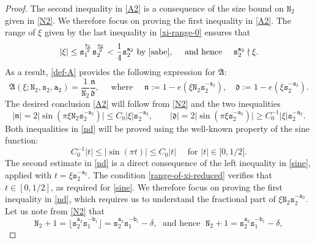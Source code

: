 \documentclass[12pt, twoside]{article}
\theoremstyle{definition}
\numberwithin{equation}{section}
\begin{document}
\begin{proof} 
The second inequality in \eqref{A2} is a consequence of the size bound on $\mathtt N_2$ given in \eqref{N2}. We therefore focus on proving the first inequality in \eqref{A2}.
\vskip0.1in
\noindent The range of $\xi$ given by the last inequality in \eqref{xi-range-0} ensures that 
\begin{equation} |\xi| \leq \mathtt s_1^{\frac{\mathtt b_1}{2}} \mathtt s_2^{\frac{\mathtt a_2}{2}} < \frac{1}{4}\mathtt s_2^{\mathtt a_2} \text{ by \eqref{sabe}}, \quad \text{ and hence } \quad \mathtt s_2^{\mathtt a_2} \nmid \xi. \label{range-of-xi-reduced} \end{equation} 
As a result, \eqref{def-A} provides the following expression for $\mathfrak A$: 
\[ \mathfrak A(\xi; \mathtt N_2, \mathtt s_2, \mathtt a_2) = \frac{1}{\mathtt N_2} \frac{\mathfrak n}{\mathfrak d}, \quad \text{ where } \quad \mathfrak n:= 1 - e(\xi \mathtt N_2 \mathtt s_2^{-\mathtt a_2}), \quad \mathfrak d:= 1 - e(\xi \mathtt s_2^{-\mathtt a_2}). \] 
The desired conclusion \eqref{A2} will follow from \eqref{N2} and the two inequalities 
\begin{equation} \label{nd} 
|\mathfrak n| = 2\bigl| \sin(\pi \xi \mathtt N_2 \mathtt s_2^{-\mathtt a_2} )\bigr| \leq C_0 |\xi| \mathtt s_2^{-\mathtt a_2}, \qquad |\mathfrak d| =2 \bigl| \sin(\pi \xi \mathtt s_2^{-\mathtt a_2})\bigr| \geq C_0^{-1} |\xi| \mathtt s_2^{-\mathtt a_2}.  
\end{equation} 
Both inequalities in \eqref{nd} will be proved using the well-known property of the sine function:
\begin{equation} \label{sine}  
C_0^{-1} |t| \leq |\sin(\pi t)| \leq C_0 |t| \quad \text{  for }  |t| \in \bigl[0, {1}/{2}\bigr].
\end{equation} 
The second estimate in \eqref{nd} is a direct consequence of the left inequality in \eqref{sine}, applied with $t = \xi \mathtt s_2^{-\mathtt a_2}$. The condition \eqref{range-of-xi-reduced} verifies that $t \in [0, 1/2]$, as required for \eqref{sine}. 
\vskip0.1in
\noindent We therefore focus on proving the first inequality in \eqref{nd}, which requires us to understand the fractional part of $\xi \mathtt N_2 \mathtt s_2^{-\mathtt a_2}$. Let us note from \eqref{N2} that 
\begin{equation}  \label{N2+1}
\mathtt N_2 + 1 = \lfloor \mathtt s_2^{\mathtt a_2} \mathtt s_1^{-\mathtt b_1} \rfloor = \mathtt s_2^{\mathtt a_2} \mathtt s_1^{-\mathtt b_1} - \delta, \; \text{ and hence } \; \mathtt N_2 + 1 = \mathtt s_2^{\mathtt a_2} \mathtt s_1^{-\mathtt b_1} - \delta, 

\end{equation}
\end{proof}
\end{document}
